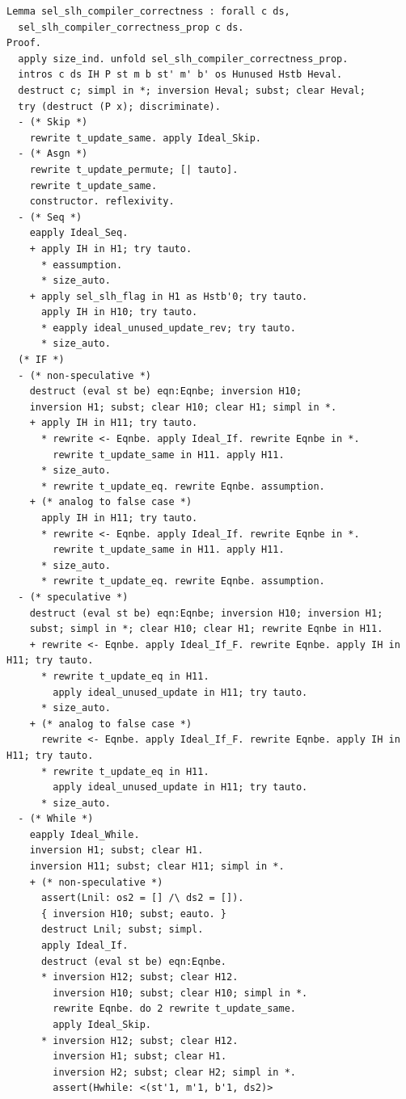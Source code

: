 \documentclass[12pt]{report}
\begin{document}
\begin{verbatim}
Lemma sel_slh_compiler_correctness : forall c ds,
  sel_slh_compiler_correctness_prop c ds.
Proof.
  apply size_ind. unfold sel_slh_compiler_correctness_prop.
  intros c ds IH P st m b st' m' b' os Hunused Hstb Heval.
  destruct c; simpl in *; inversion Heval; subst; clear Heval;
  try (destruct (P x); discriminate).
  - (* Skip *)
    rewrite t_update_same. apply Ideal_Skip.
  - (* Asgn *)
    rewrite t_update_permute; [| tauto].
    rewrite t_update_same.
    constructor. reflexivity.
  - (* Seq *)
    eapply Ideal_Seq.
    + apply IH in H1; try tauto.
      * eassumption.
      * size_auto.
    + apply sel_slh_flag in H1 as Hstb'0; try tauto.
      apply IH in H10; try tauto.
      * eapply ideal_unused_update_rev; try tauto.
      * size_auto.
  (* IF *)
  - (* non-speculative *)
    destruct (eval st be) eqn:Eqnbe; inversion H10;
    inversion H1; subst; clear H10; clear H1; simpl in *.
    + apply IH in H11; try tauto.
      * rewrite <- Eqnbe. apply Ideal_If. rewrite Eqnbe in *.
        rewrite t_update_same in H11. apply H11.
      * size_auto.
      * rewrite t_update_eq. rewrite Eqnbe. assumption.
    + (* analog to false case *)
      apply IH in H11; try tauto.
      * rewrite <- Eqnbe. apply Ideal_If. rewrite Eqnbe in *.
        rewrite t_update_same in H11. apply H11.
      * size_auto.
      * rewrite t_update_eq. rewrite Eqnbe. assumption.
  - (* speculative *)
    destruct (eval st be) eqn:Eqnbe; inversion H10; inversion H1;
    subst; simpl in *; clear H10; clear H1; rewrite Eqnbe in H11.
    + rewrite <- Eqnbe. apply Ideal_If_F. rewrite Eqnbe. apply IH in H11; try tauto.
      * rewrite t_update_eq in H11.
        apply ideal_unused_update in H11; try tauto.
      * size_auto.
    + (* analog to false case *)
      rewrite <- Eqnbe. apply Ideal_If_F. rewrite Eqnbe. apply IH in H11; try tauto.
      * rewrite t_update_eq in H11.
        apply ideal_unused_update in H11; try tauto.
      * size_auto.
  - (* While *)
    eapply Ideal_While.
    inversion H1; subst; clear H1.
    inversion H11; subst; clear H11; simpl in *.
    + (* non-speculative *)
      assert(Lnil: os2 = [] /\ ds2 = []).
      { inversion H10; subst; eauto. }
      destruct Lnil; subst; simpl.
      apply Ideal_If.
      destruct (eval st be) eqn:Eqnbe.
      * inversion H12; subst; clear H12.
        inversion H10; subst; clear H10; simpl in *.
        rewrite Eqnbe. do 2 rewrite t_update_same.
        apply Ideal_Skip.
      * inversion H12; subst; clear H12.
        inversion H1; subst; clear H1.
        inversion H2; subst; clear H2; simpl in *.
        assert(Hwhile: <(st'1, m'1, b'1, ds2)>

\end{verbatim}
\end{document}
